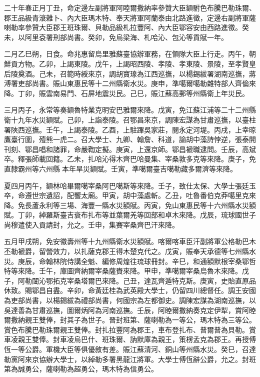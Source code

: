 \begin{pinyinscope}
二十年春正月丁丑，命定邊左副將軍阿睦爾撒納率參贊大臣額駙色布騰巴勒珠爾、郡王品級青滾雜卜、內大臣瑪木特、奉天將軍阿蘭泰由北路進徵，定邊右副將軍薩喇勒率參贊大臣郡王班珠爾、貝勒品級札拉豐阿、內大臣鄂容安由西路進徵。癸未，以阿里袞署刑部尚書。癸卯，免烏梁海、札哈沁、包沁等貢賦一年。

二月乙巳朔，日食。命兆惠留烏里雅蘇臺協辦軍務，在領隊大臣上行走。丙午，朝鮮貢方物。乙卯，上謁東陵。戊午，上謁昭西陵、孝陵、孝東陵、景陵，至孝賢皇后陵奠酒。己未，召範時綬來京，調胡寶瑔為江西巡撫，以楊錫紱署湖南巡撫，蔣溥署吏部尚書。賑山東惠民等十二州縣衛水災。庚申，準噶爾噶勒雜特部人齊倫來降。丁卯，賑雲南易門、石屏地震災民。己巳，賑江蘇高郵等州縣衛上年災民。

三月丙子，永常等奏額魯特業克明安巴雅爾來降。戊寅，免江蘇江浦等二十二州縣衛十九年水災額賦。己卯，上詣泰陵。召鄂昌來京，調陳宏謀為甘肅巡撫，以臺柱署陜西巡撫。壬午，上謁泰陵。乙酉，上駐蹕吳家莊，閱永定河堤。丙戌，上幸晾鷹臺行圍，殪熊一虎二。召大學士、九卿、翰詹、科道，諭胡中藻詩悖逆，張泰開刊刻、鄂昌唱和諸罪，命嚴鞫定擬。庚寅，上還京師。鄂昌褫職逮問。壬辰，高斌卒。釋張師載回籍。乙未，扎哈沁得木齊巴哈曼集、宰桑敦多克等來降。庚子，免直隸霸州等六州縣本年旱災額賦。壬寅，準噶爾臺吉噶勒藏多爾濟等來降。

夏四月丙午，額林哈畢爾噶宰桑阿巴噶斯等來降。壬子，致仕太保、大學士張廷玉卒，命遵世宗遺詔，配饗太廟。甲寅，胡中藻處斬。乙丑，吐魯番伯克莽噶里克來降。免長蘆永利等三場、海豐一縣水災額賦。丙寅，免山東惠民等十六州縣水災額賦。丁卯，綽羅斯臺吉袞布扎布等並葉爾羌等回部和卓木來降。戊辰，琉球國世子尚穆遣使入貢請封，允之。壬申，集賽宰桑齊巴汗來降。

五月甲戌朔，免安徽壽州等十九州縣衛水災額賦。喀爾喀車臣汗副將軍公格勒巴木丕勒褫爵，留營效力，以扎薩克郡王得木楚克代之。戊寅，賑奉天承德等七州縣水災。庚辰，命翰林院侍講全魁、編修周煌往琉球冊封。辛巳，和通額默根宰桑鄂哲特等來降。壬午，庫圖齊納爾宰桑薩賚來降。甲申，準噶爾宰桑烏魯木來降。戊子，阿勒闥沁鄂拓克宰桑塔爾巴來降。己丑，達瓦齊遁特克斯。庚寅，史貽直原品休致。賜鄂昌自盡。辛卯，命黃廷桂為武英殿大學士，仍留四川總督任。調王安國為吏部尚書，以楊錫紱為禮部尚書，何國宗為左都御史。調陳宏謀為湖南巡撫，以吳達善為甘肅巡撫，圖爾炳阿為河南巡撫。壬辰，阿睦爾撒納奏克定伊犁，賞阿睦爾撒納親王雙俸，封其子為世子。晉封班第、薩喇勒為一等公，瑪木特為三等公。賞色布騰巴勒珠爾親王雙俸。封扎拉豐阿為郡王，車布登扎布、普爾普為貝勒。賞車凌親王雙俸。封車凌烏巴什、班珠爾、訥默庫為親王，策楞孟克為郡王。再授傅恆一等公爵。軍機大臣等俱優敘有差。賑江蘇清河、銅山等州縣水災。癸巳，召達勒黨阿來京協辦大學士，以綽勒多署黑龍江將軍。大學士傅恆辭公爵，允之。封班第為誠勇公，薩喇勒為超勇公，瑪木特為信勇公。


\end{pinyinscope}
